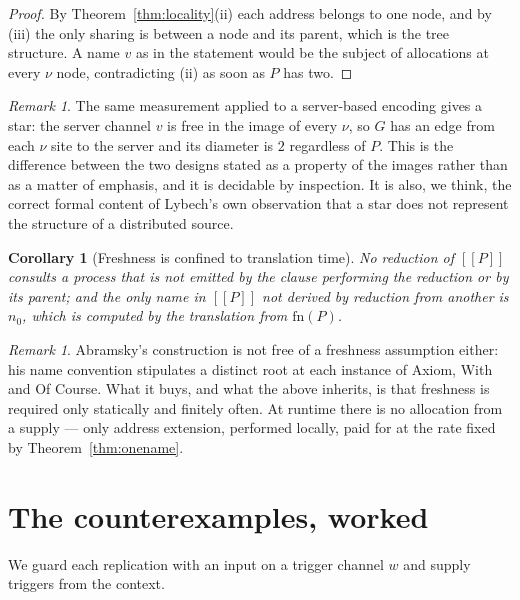 \documentclass[11pt]{article}
\theoremstyle{definition}
\theoremstyle{plain}
\newtheorem{corollary}[definition]{Corollary}
\theoremstyle{remark}
\newtheorem{remark}[definition]{Remark}
\newcommand{\enc}[1]{[\![#1]\!]}
\newcommand{\fn}{\mathrm{fn}}
\begin{document}
\begin{proof}
By Theorem~\ref{thm:locality}(ii) each address belongs to one node, and
by (iii) the only sharing is between a node and its parent, which is the
tree structure. A name $v$ as in the statement would be the subject of
allocations at every $\nu$ node, contradicting (ii) as soon as $P$ has
two.
\end{proof}

\begin{remark}
The same measurement applied to a server-based encoding gives a star: the
server channel $v$ is free in the image of every $\nu$, so $G$ has an
edge from each $\nu$ site to the server and its diameter is $2$
regardless of $P$. This is the difference between the two designs stated
as a property of the images rather than as a matter of emphasis, and it
is decidable by inspection. It is also, we think, the correct formal
content of Lybech's own observation that a star does not represent the
structure of a distributed source.
\end{remark}

\begin{corollary}[Freshness is confined to translation time]
No reduction of $\enc{P}$ consults a process that is not emitted by the
clause performing the reduction or by its parent; and the only name in
$\enc{P}$ not derived by reduction from another is $n_0$, which is
computed by the translation from $\fn(P)$.
\end{corollary}

\begin{remark}
Abramsky's construction is not free of a freshness assumption either: his
name convention stipulates a distinct root at each instance of Axiom,
With and Of Course. What it buys, and what the above inherits, is that
freshness is required only statically and finitely often. At runtime
there is no allocation from a supply --- only address extension,
performed locally, paid for at the rate fixed by
Theorem~\ref{thm:onename}.
\end{remark}

\section{The counterexamples, worked}\label{sec:worked}

We guard each replication with an input on a trigger channel $w$ and
supply triggers from the context.
\end{document}
